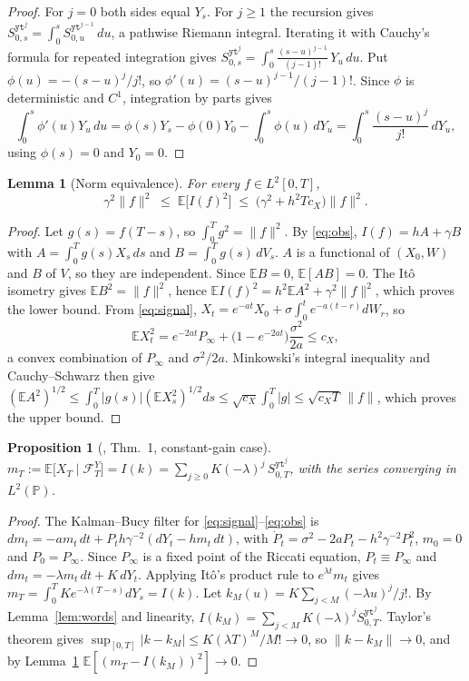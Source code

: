 \documentclass[11pt]{article}
\newtheorem{proposition}[theorem]{Proposition}
\newtheorem{lemma}[theorem]{Lemma}
\theoremstyle{remark}
\newcommand{\E}{\mathbb{E}}
\newcommand{\Sig}{S}
\newcommand{\wy}{\mathtt y}
\newcommand{\wt}{\mathtt t}
\begin{document}
\begin{proof}
For $j=0$ both sides equal $Y_s$. For $j\ge1$ the recursion gives
$\Sig^{\wy\wt^{j}}_{0,s}=\int_0^s \Sig^{\wy\wt^{j-1}}_{0,u}\,du$, a pathwise Riemann integral. Iterating
it with Cauchy's formula for repeated integration gives
$\Sig^{\wy\wt^{j}}_{0,s}=\int_0^s \frac{(s-u)^{j-1}}{(j-1)!}\,Y_u\,du$. Put
$\phi(u)=-(s-u)^j/j!$, so $\phi'(u)=(s-u)^{j-1}/(j-1)!$. Since $\phi$ is deterministic and $C^1$,
integration by parts \citep[Ch.~II]{protter2005} gives
\[
  \int_0^s \phi'(u)Y_u\,du=\phi(s)Y_s-\phi(0)Y_0-\int_0^s\phi(u)\,dY_u=\int_0^s\frac{(s-u)^j}{j!}\,dY_u,
\]
using $\phi(s)=0$ and $Y_0=0$.
\end{proof}

\begin{lemma}[Norm equivalence]\label{lem:norm}
For every $f\in L^2[0,T]$,
\[
  \gamma^2\|f\|^2\;\le\;\E\big[I(f)^2\big]\;\le\;\big(\gamma^2+h^2Tc_X\big)\|f\|^2 .
\]
\end{lemma}

\begin{proof}
Let $g(s)=f(T-s)$, so $\int_0^Tg^2=\|f\|^2$. By \eqref{eq:obs}, $I(f)=hA+\gamma B$ with
$A=\int_0^T g(s)X_s\,ds$ and $B=\int_0^T g(s)\,dV_s$. $A$ is a functional of $(X_0,W)$ and $B$ of $V$,
so they are independent. Since $\E B=0$, $\E[AB]=0$. The It\^o isometry gives $\E B^2=\|f\|^2$,
hence $\E I(f)^2=h^2\E A^2+\gamma^2\|f\|^2$, which proves the lower bound.
From \eqref{eq:signal}, $X_t=e^{-at}X_0+\sigma\int_0^te^{-a(t-r)}dW_r$, so
\[
  \E X_t^2=e^{-2at}P_\infty+\big(1-e^{-2at}\big)\frac{\sigma^2}{2a}\le c_X ,
\]
a convex combination of $P_\infty$ and $\sigma^2/2a$. Minkowski's integral inequality and
Cauchy--Schwarz then give
$(\E A^2)^{1/2}\le\int_0^T|g(s)|(\E X_s^2)^{1/2}ds\le\sqrt{c_X}\int_0^T|g|\le\sqrt{c_XT}\,\|f\|$,
which proves the upper bound.
\end{proof}

\begin{proposition}[\citealp{cohen2023}, Thm.~1, constant-gain case]\label{prop:rep}
$\displaystyle m_T:=\E\big[X_T\mid\mathcal F^Y_T\big]=I(k)=\sum_{j\ge0}K(-\lambda)^j\,\Sig^{\wy\wt^{j}}_{0,T}$,
with the series converging in $L^2(\mathbb P)$.
\end{proposition}

\begin{proof}
The Kalman--Bucy filter \citep{kalman1961,bain2009} for \eqref{eq:signal}--\eqref{eq:obs} is
$dm_t=-am_t\,dt+P_th\gamma^{-2}(dY_t-hm_t\,dt)$, with $\dot P_t=\sigma^2-2aP_t-h^2\gamma^{-2}P_t^2$,
$m_0=0$ and $P_0=P_\infty$. Since $P_\infty$ is a fixed point of the Riccati equation,
$P_t\equiv P_\infty$ and $dm_t=-\lambda m_t\,dt+K\,dY_t$. Applying It\^o's product rule to
$e^{\lambda t}m_t$ gives $m_T=\int_0^TKe^{-\lambda(T-s)}dY_s=I(k)$.
Let $k_M(u)=K\sum_{j<M}(-\lambda u)^j/j!$. By Lemma~\ref{lem:words} and linearity,
$I(k_M)=\sum_{j<M}K(-\lambda)^j\Sig^{\wy\wt^{j}}_{0,T}$. Taylor's theorem gives
$\sup_{[0,T]}|k-k_M|\le K(\lambda T)^M/M!\to0$, so $\|k-k_M\|\to0$, and by
Lemma~\ref{lem:norm} $\E[(m_T-I(k_M))^2]\to0$.
\end{proof}
\end{document}
